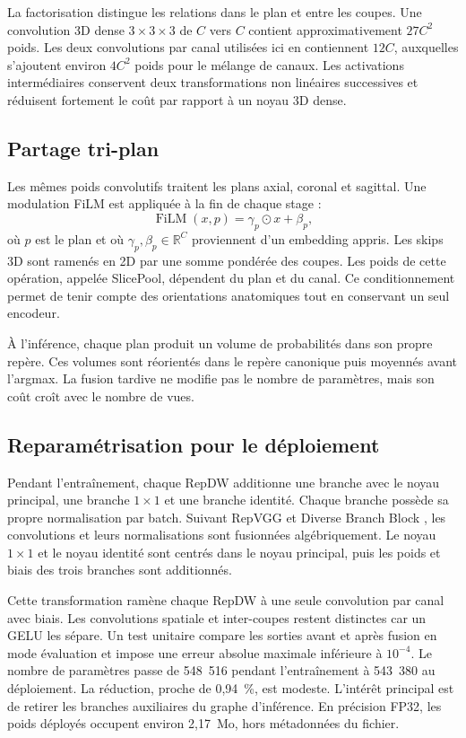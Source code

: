 \documentclass[11pt,a4paper]{article}
\begin{document}
La factorisation distingue les relations dans le plan et entre les coupes. Une
convolution 3D dense $3\times3\times3$ de $C$ vers $C$ contient
approximativement $27C^2$ poids. Les deux convolutions par canal utilisées ici
en contiennent $12C$, auxquelles s'ajoutent environ $4C^2$ poids pour le mélange
de canaux. Les activations intermédiaires conservent deux transformations non
linéaires successives et réduisent fortement le coût par rapport à un noyau 3D
dense.

\subsection{Partage tri-plan}

Les mêmes poids convolutifs traitent les plans axial, coronal et sagittal. Une
modulation FiLM \cite{perez2018film} est appliquée à la fin de chaque stage :
\begin{equation}
  \operatorname{FiLM}(x,p) = \gamma_p\odot x + \beta_p,
\end{equation}
où $p$ est le plan et où $\gamma_p,\beta_p\in\mathbb{R}^{C}$ proviennent d'un
embedding appris. Les skips 3D sont ramenés en 2D par une somme pondérée des
coupes. Les poids de cette opération, appelée SlicePool, dépendent du plan et
du canal. Ce conditionnement permet de tenir compte des orientations
anatomiques tout en conservant un seul encodeur.

À l'inférence, chaque plan produit un volume de probabilités dans son propre
repère. Ces volumes sont réorientés dans le repère canonique puis moyennés avant
l'argmax. La fusion tardive ne modifie pas le nombre de paramètres, mais son
coût croît avec le nombre de vues.

\subsection{Reparamétrisation pour le déploiement}

Pendant l'entraînement, chaque RepDW additionne une branche avec le noyau
principal, une branche $1\times1$ et une branche identité. Chaque branche
possède sa propre normalisation par batch. Suivant RepVGG \cite{ding2021repvgg}
et Diverse Branch Block \cite{ding2021dbb}, les convolutions et leurs
normalisations sont fusionnées algébriquement. Le noyau $1\times1$ et le noyau
identité sont centrés dans le noyau principal, puis les poids et biais des trois
branches sont additionnés.

Cette transformation ramène chaque RepDW à une seule convolution par canal avec
biais. Les convolutions spatiale et inter-coupes restent distinctes car un GELU
les sépare. Un test unitaire compare les sorties avant et après fusion en mode
évaluation et impose une erreur absolue maximale inférieure à $10^{-4}$. Le
nombre de paramètres passe de 548~516 pendant l'entraînement à 543~380 au
déploiement. La réduction, proche de 0,94~\%, est modeste. L'intérêt principal
est de retirer les branches auxiliaires du graphe d'inférence. En précision
FP32, les poids déployés occupent environ 2,17~Mo, hors métadonnées du fichier.
\end{document}
